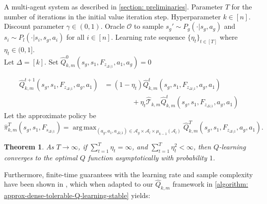 \documentclass{article}
\theoremstyle{plain}
\newtheorem{theorem}{Theorem}[section]
\theoremstyle{definition}
\DeclareMathOperator*{\argmax}{arg\,max}
\begin{document}
\begin{algorithm}[ht]
\caption{Stable (Practical) Implementation of \cref{algorithm: approx-dense-tolerable-Q-learning-exp}:  \texttt{SUBSAMPLE-Q}: Learning }\label{algorithm: approx-dense-tolerable-Q-learning-stable}
\begin{algorithmic}[1]
\REQUIRE A multi-agent system as described in \cref{section: preliminaries}. Parameter $T$ for the number of iterations in the initial value iteration step. Hyperparameter $k \in [n]$. Discount parameter $\gamma\in (0,1)$. Oracle $\mathcal{O}$ to sample $s_g'\sim {P}_g(\cdot|s_g,a_g)$ and $s_i\sim {P}_l(\cdot|s_i,s_g,a_i)$ for all $i\in[n]$. Learning rate sequence $\{\eta_t\}_{t\in [T]}$ where $\eta_t \in (0,1]$.\\
\STATE Let $\Delta = [k]$.
\STATE Set $\hat{Q}^0_{k,m}(s_g, s_1, F_{z_{\Delta\setminus 1}}, a_1, a_g)=0$\\
\ENDFOR\ENDFOR

\STATE \begin{align*}\hat{Q}^{t+1}_{k,m}(s_g, s_1, F_{z_{\Delta\setminus 1}}, a_g, a_1)&=(1-\eta_t)\hat{Q}_{k,m}^{t}(s_g, s_1, F_{z_{\Delta\setminus 1}}, a_g, a_1)\\
&\quad\quad\quad\quad +\!\eta_t \hat{\mathcal{T}}_{k,m} \hat{Q}^t_{k,m}(s_g, s_1, F_{z_{\Delta\setminus 1}}, a_g, a_1)\end{align*}
\ENDFOR
\ENDFOR
\ENDFOR
\STATE Let the approximate policy be \[\hat{\pi}_{k,m}^T(s_g, s_1, F_{s_{\Delta\setminus 1}}) = \mathop{\argmax}_{(a_g,a_1,a_{\Delta\setminus 1})\in\mathcal{A}_g\times \mathcal{A}_l\times \mu_{k-1}{(\mathcal{A}_l)}}\hat{Q}_{k,m}^T(s_g,s_1, F_{z_{\Delta\setminus 1}}, a_g, a_1).\]
\end{algorithmic}
\end{algorithm}


\begin{theorem}
As $T\to\infty$, if $\sum_{t=1}^T \eta_t = \infty$, and $\sum_{t=1}^T \eta_t^2 < \infty$, then $Q$-learning converges to the optimal $Q$ function asymptotically with probability $1$.
\end{theorem}

Furthermore, finite-time guarantees with the learning rate and sample complexity have been shown in \cite{pmlr-v151-chen22i}, which when adapted to our $\hat{Q}_{k,m}$ framework in \cref{algorithm: approx-dense-tolerable-Q-learning-stable} yields:
\end{document}
